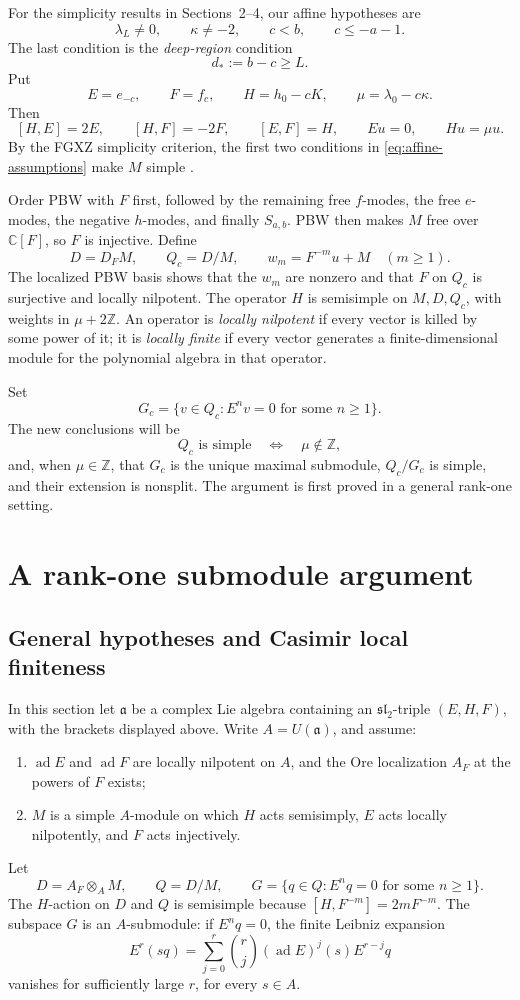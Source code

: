 \documentclass[11pt,a4paper]{article}
\newcommand{\C}{\mathbb C}
\newcommand{\Z}{\mathbb Z}
\newcommand{\slc}{\mathfrak{sl}_2}
\newcommand{\ad}{\operatorname{ad}}
\theoremstyle{plainupright}
\begin{document}
For the simplicity results in Sections~2--4, our affine hypotheses are
\begin{equation}\label{eq:affine-assumptions}
\lambda_L\ne0,\qquad \kappa\ne-2,\qquad
c<b,\qquad c\le-a-1.
\end{equation}
The last condition is the \emph{deep-region} condition
\[
d_*:=b-c\ge L.
\]
Put
\[
E=e_{-c},\qquad F=f_c,\qquad H=h_0-cK,\qquad
\mu=\lambda_0-c\kappa.
\]
Then
\[
[H,E]=2E,\qquad [H,F]=-2F,\qquad [E,F]=H,\qquad
Eu=0,\qquad Hu=\mu u.
\]
By the FGXZ simplicity criterion, the first two conditions in
\eqref{eq:affine-assumptions} make \(M\) simple
\cite[Theorem 1.1]{FGXZ}.

Order PBW with \(F\) first, followed by the remaining free \(f\)-modes,
the free \(e\)-modes, the negative \(h\)-modes, and finally \(S_{a,b}\).
PBW then makes \(M\) free over \(\C[F]\), so \(F\) is injective. Define
\[
D=D_FM,\qquad Q_c=D/M,\qquad
w_m=F^{-m}u+M\quad(m\ge1).
\]
The localized PBW basis shows that the \(w_m\) are nonzero and that
\(F\) on \(Q_c\) is surjective and locally nilpotent. The operator \(H\)
is semisimple on \(M,D,Q_c\), with weights in \(\mu+2\Z\).
An operator is \emph{locally nilpotent} if every vector is killed by
some power of it; it is \emph{locally finite} if every vector generates
a finite-dimensional module for the polynomial algebra in that operator.

Set
\[
G_c=\{v\in Q_c:E^nv=0\text{ for some }n\ge1\}.
\]
The new conclusions will be
\[
Q_c\text{ is simple}\quad\Longleftrightarrow\quad\mu\notin\Z,
\]
and, when \(\mu\in\Z\), that \(G_c\) is the unique maximal submodule,
\(Q_c/G_c\) is simple, and their extension is nonsplit.
The argument is first proved in a general rank-one setting.

\section{A rank-one submodule argument}

\subsection{General hypotheses and Casimir local finiteness}

In this section let \(\mathfrak a\) be a complex Lie algebra containing
an \(\slc\)-triple \((E,H,F)\), with the brackets displayed above.
Write \(A=U(\mathfrak a)\), and assume:
\begin{enumerate}[label=\textup{(\roman*)}]
\item \(\ad E\) and \(\ad F\) are locally nilpotent on \(A\), and
the Ore localization \(A_F\) at the powers of \(F\) exists;
\item \(M\) is a simple \(A\)-module on which \(H\) acts semisimply,
\(E\) acts locally nilpotently, and \(F\) acts injectively.
\end{enumerate}
Let
\[
D=A_F\otimes_A M,\qquad Q=D/M,\qquad
G=\{q\in Q:E^nq=0\text{ for some }n\ge1\}.
\]
The \(H\)-action on \(D\) and \(Q\) is semisimple because
\([H,F^{-m}]=2mF^{-m}\).
The subspace \(G\) is an \(A\)-submodule: if \(E^nq=0\), the finite
Leibniz expansion
\[
E^r(sq)=\sum_{j=0}^r\binom rj(\ad E)^j(s)E^{r-j}q
\]
vanishes for sufficiently large \(r\), for every \(s\in A\).
\end{document}
